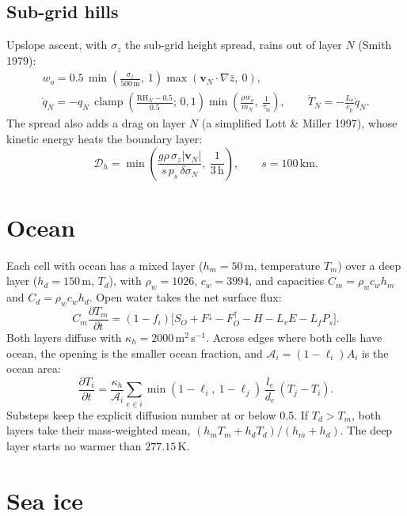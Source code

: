 \documentclass[11pt,a4paper]{article}
\newcommand{\pd}[2]{\frac{\partial #1}{\partial #2}}
\newcommand{\vect}[1]{\bm{#1}}
\newcommand{\clamp}{\operatorname{clamp}}
\begin{document}
\subsection{Sub-grid hills}\label{sec:hills}
Upslope ascent, with $\sigma_z$ the sub-grid height spread, rains out of layer $N$
(Smith 1979):
\begin{gather}
w_o = 0.5\,\min\!\left(\frac{\sigma_z}{500\,\mathrm{m}},\ 1\right)
   \max(\vect{v}_N\cdot\nabla\bar z,\ 0), \\
\dot q_N = -q_N\,\clamp\!\left(\frac{\mathrm{RH}_N - 0.5}{0.5};\,0,1\right)
   \min\!\left(\frac{\rho w_o}{m_N},\ \frac{1}{\tau_{\mathrm{ls}}}\right),
\qquad \dot T_N = -\frac{L_v}{c_p}\dot q_N .
\end{gather}
The spread also adds a drag on layer $N$ (a simplified Lott \& Miller 1997), whose
kinetic energy heats the boundary layer:
\begin{equation}
\mathcal{D}_h = \min\!\left(\frac{g\rho\,\sigma_z|\vect{v}_N|}{s\,p_s\,\delta\sigma_N},\
   \frac{1}{3\,\mathrm{h}}\right), \qquad s = 100\,\mathrm{km}.
\end{equation}

\section{Ocean}

Each cell with ocean has a mixed layer ($h_m = 50$\,m, temperature $T_m$) over a deep
layer ($h_d = 150$\,m, $T_d$), with $\rho_w = 1026$, $c_w = 3994$, and capacities
$C_m = \rho_wc_wh_m$ and $C_d = \rho_wc_wh_d$. Open water takes the net surface flux:
\begin{equation}
C_m\pd{T_m}{t} = (1-f_i)\bigl[S_O + F^\downarrow - F^\uparrow_O - H - L_vE - L_fP_s\bigr].
\end{equation}
Both layers diffuse with $\kappa_h = 2000$\,m$^2$\,s$^{-1}$. Across edges where both
cells have ocean, the opening is the smaller ocean fraction, and $\mathcal{A}_i =
(1-\ell_i)A_i$ is the ocean area:
\begin{equation}
\pd{T_i}{t} = \frac{\kappa_h}{\mathcal{A}_i}\sum_{e\in i}
   \min(1-\ell_i,\ 1-\ell_j)\,\frac{l_e}{d_e}\,(T_j - T_i).
\end{equation}
Substeps keep the explicit diffusion number at or below 0.5. If $T_d > T_m$, both
layers take their mass-weighted mean, $(h_mT_m + h_dT_d)/(h_m + h_d)$. The deep layer
starts no warmer than $277.15$\,K.

\section{Sea ice}
\end{document}
